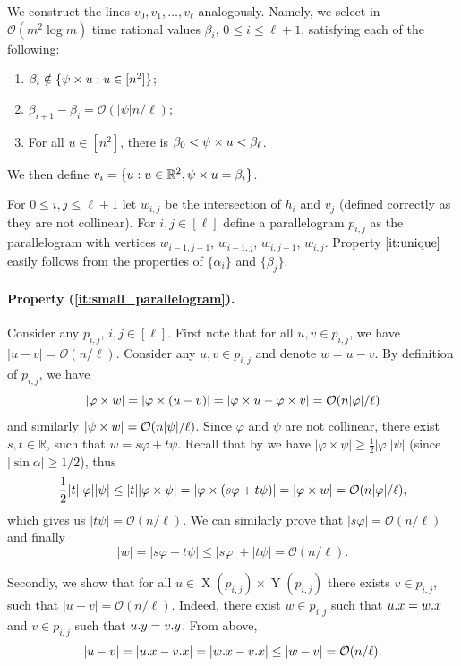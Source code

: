 \documentclass[11pt, letterpaper]{article}
\theoremstyle{plain}
\theoremstyle{definition}
\theoremstyle{remark}
\newcommand{\R}{\mathbb{R}}
\renewcommand{\O}{\mathcal{O}}
\renewcommand{\phi}{\varphi}
\DeclareMathOperator*{\X}{X}
\DeclareMathOperator*{\Y}{Y}
\begin{document}
We construct the lines $v_0, v_1, \ldots, v_\ell$ analogously. Namely, we select in $\O(m^2 \log m)$ time rational values $\beta_i$, $0 \le i \le \ell+1$, satisfying each of the following:
\begin{enumerate}
\item $\beta_i \notin \{\psi \times u : u \in [n^2]\}$;
\item $\beta_{i+1}-\beta_i = \O(|\psi| n / \ell)$;
\item For all $u \in [n^2]$, there is $\beta_0 < \psi \times u < \beta_\ell$.
\end{enumerate}
We then define $v_i = \{u: u \in \R^2, \s{u} = \beta_i\}$. 

For $0 \le i,j \le \ell+1$ let $w_{i,j}$ be the intersection of $h_i$ and $v_j$ (defined correctly as they are not collinear). For $i,j \in [\ell]$ define a parallelogram $p_{i,j}$ as the parallelogram with vertices $w_{i-1,j-1}$, $w_{i-1,j}$, $w_{i,j-1}$, $w_{i,j}$. Property $\ref{it:unique}$ easily follows from the properties of $\{\alpha_i\}$ and $\{\beta_j\}$.

\paragraph*{Property (\ref{it:small_parallelogram}).}
Consider any $p_{i,j}$, $i,j \in [\ell]$. First note that	for all $u, v \in p_{i, j}$, we have $|u - v| = \O(n / \ell)$. Consider any $u, v \in p_{i, j}$ and denote $w = u - v$.
By definition of $p_{i, j}$, we have
\[ |\h{w}| = |\h{(u - v)}| = |\h{u} - \h{v}| = \O(n|\phi| / \ell) \]
and similarly $|\s{w}| = \O(n|\psi| / \ell)$. Since $\phi$ and $\psi$ are not collinear, there exist $s, t \in \mathbb{R}$, such that $w = s\phi + t\psi$. Recall that by  we have $|\phi \times \psi| \ge \frac{1}{2}|\phi||\psi|$ (since $|\sin \alpha| \ge 1/2$), thus
\[ \frac{1}{2}|t||\phi||\psi| \le |t||\phi \times \psi| = |\phi \times (s\phi + t\psi)| = |\h{w}| = \O(n|\phi| / \ell), \]
which gives us $|t\psi| = \O(n / \ell)$. We can similarly prove that $|s\phi| = \O(n / \ell)$ and finally 
\[ |w| = |s\phi + t\psi| \le |s\phi| + |t\psi| = \O(n / \ell). \]

Secondly, we show that	for all $u \in \X(p_{i, j}) \times \Y(p_{i, j})$ there exists $v \in p_{i, j}$, such that $|u - v| = \O(n / \ell)$. Indeed, there exist $w \in p_{i, j}$ such that $u.x = w.x$ and $v \in p_{i, j}$ such that $u.y = v.y$. From above, 
\[|u - v| = |\x{u} - \x{v}| = |\x{w} - \x{v}| \le |w - v| = \O(n / \ell).\] 
\end{document}
